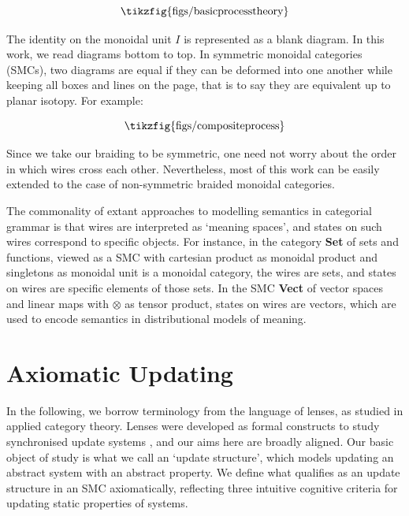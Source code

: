 \documentclass[11pt]{article}
\newcommand{\tikzfigscale}[2]{\scalebox{#1}{\tikzfig{#2}}}
\theoremstyle{definition}
\theoremstyle{plain}
\begin{document}
\begin{equation}\label{basicprocesstheory}
\tikzfigscale{1}{figs/basicprocesstheory}
\end{equation}

The identity on the monoidal unit $I$ is represented as a blank diagram. In this work, we read diagrams bottom to top. In symmetric monoidal categories (SMCs), two diagrams are equal if they can be deformed into one another while keeping all boxes and lines on the page, that is to say they are equivalent up to planar isotopy. For example: 

\begin{equation}
\tikzfigscale{1}{figs/compositeprocess}
\end{equation}

Since we take our braiding to be symmetric, one need not worry about the order in which wires cross each other. Nevertheless, most of this work can be easily extended to the case of non-symmetric braided monoidal categories.

The commonality of extant approaches to modelling semantics in categorial grammar is that wires are interpreted as `meaning spaces', and states on such wires correspond to specific objects. For instance, in the category \textbf{Set} of sets and functions, viewed as a SMC with cartesian product as monoidal product and singletons as monoidal unit is a monoidal category, the wires are sets, and states on wires are specific elements of those sets. In the SMC \textbf{Vect} of vector spaces and linear maps with $\otimes$ as tensor product, states on wires are vectors, which are used to encode semantics in distributional models of meaning.

\section{Axiomatic Updating}

In the following, we borrow terminology from the language of lenses, as studied in applied category theory. Lenses were developed as formal constructs \cite{foster_combinators_nodate} to study synchronised update systems \cite{bancilhon_update_1981}, and our aims here are broadly aligned. Our basic object of study is what we call an `update structure', which models updating an abstract system with an abstract property. We define what qualifies as an update structure in an SMC axiomatically, reflecting three intuitive cognitive criteria for updating static properties of systems.
\end{document}
